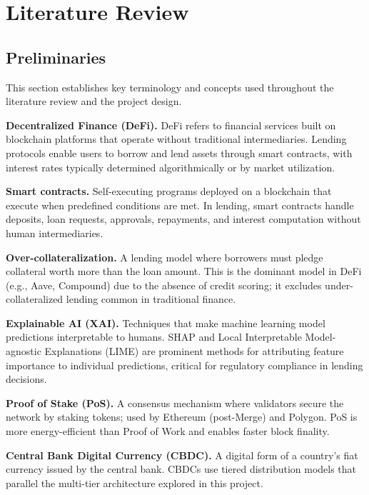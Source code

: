 \documentclass[12pt,a4paper]{report}
\begin{document}
\chapter{Literature Review}

\section{Preliminaries}

This section establishes key terminology and concepts used throughout the literature review and the project design.

\hangindent=0.5in \textbf{Decentralized Finance (DeFi).} DeFi refers to financial services built on blockchain platforms that operate without traditional intermediaries. Lending protocols enable users to borrow and lend assets through smart contracts, with interest rates typically determined algorithmically or by market utilization.

\hangindent=0.5in \textbf{Smart contracts.} Self-executing programs deployed on a blockchain that execute when predefined conditions are met. In lending, smart contracts handle deposits, loan requests, approvals, repayments, and interest computation without human intermediaries.

\hangindent=0.5in \textbf{Over-collateralization.} A lending model where borrowers must pledge collateral worth more than the loan amount. This is the dominant model in DeFi (e.g., Aave, Compound) due to the absence of credit scoring; it excludes under-collateralized lending common in traditional finance.

\hangindent=0.5in \textbf{Explainable AI (XAI).} Techniques that make machine learning model predictions interpretable to humans. SHAP and Local Interpretable Model-agnostic Explanations (LIME) are prominent methods for attributing feature importance to individual predictions, critical for regulatory compliance in lending decisions.

\hangindent=0.5in \textbf{Proof of Stake (PoS).} A consensus mechanism where validators secure the network by staking tokens; used by Ethereum (post-Merge) and Polygon. PoS is more energy-efficient than Proof of Work and enables faster block finality.

\hangindent=0.5in \textbf{Central Bank Digital Currency (CBDC).} A digital form of a country's fiat currency issued by the central bank. CBDCs use tiered distribution models that parallel the multi-tier architecture explored in this project.
\end{document}
